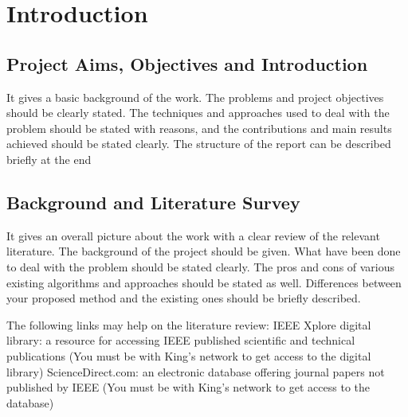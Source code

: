 \section{Introduction}
\subsection{Project Aims, Objectives and Introduction} 
It gives a basic background of the work.  The problems and project objectives should be clearly stated.  The techniques and approaches used to deal with the problem should be stated with reasons, and the contributions and main results achieved should be stated clearly.  The structure of the report can be described briefly at the end %
\subsection{Background and Literature Survey} %
 It gives an overall picture about the work with a clear review of the relevant literature.  The background of the project should be given.  What have been done to deal with the problem should be stated clearly.  The pros and cons of various existing algorithms and approaches should be stated as well.  Differences between your proposed method and the existing ones should be briefly described.

The following links may help on the literature review:
IEEE Xplore digital library: a resource for accessing IEEE published scientific and technical publications (You must be with King's network to get access to the digital library)
ScienceDirect.com: an electronic database offering journal papers not published by IEEE (You must be with King's network to get access to the database)
